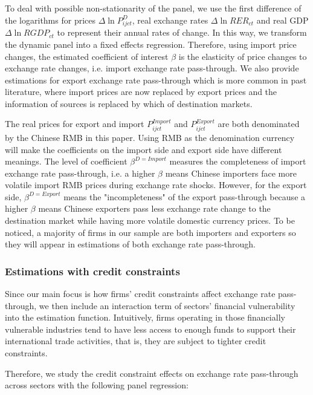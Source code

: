 \documentclass[12pt]{article}
\begin{document}
To deal with possible non-stationarity of the panel, we use the first difference of the logarithms for prices $\Delta \ln P^{D}_{i j c t}$, real exchange rates $\Delta \ln R E R_{c t}$ and real GDP $\Delta \ln R G D P_{c t}$ to represent their annual rates of change. In this way, we transform the dynamic panel into a fixed effects regression. Therefore, using import price changes, the estimated coefficient of interest $\beta$ is the elasticity of price changes to exchange rate changes, i.e. import exchange rate pass-through. We also provide estimations for export exchange rate pass-through which is more common in past literature, where import prices are now replaced by export prices and the information of sources is replaced by which of destination markets. 

The real prices for export and import $P^{Import}_{i j c t}$ and $P^{Export}_{i j c t}$ are both denominated by the Chinese RMB in this paper. Using RMB as the denomination currency will make the coefficients on the import side and export side have different meanings. The level of coefficient $\beta^{D=Import}$ measures the completeness of import exchange rate pass-through, i.e. a higher $\beta$ means Chinese importers face more volatile import RMB prices during exchange rate shocks. However, for the export side,  $\beta^{D=Export}$ means the "incompleteness" of the export pass-through because a higher $\beta$ means Chinese exporters pass less exchange rate change to the destination market while having more volatile domestic currency prices. To be noticed, a majority of firms in our sample are both importers and exporters so they will appear in estimations of both exchange rate pass-through.

\subsubsection{Estimations with credit constraints}

Since our main focus is how firms' credit constraints affect exchange rate pass-through, we then include an interaction term of sectors’ financial vulnerability into the estimation function. Intuitively, firms operating in those financially vulnerable industries tend to have less access to enough funds to support their international trade activities, that is, they are subject to tighter credit constraints.

Therefore, we study the credit constraint effects on exchange rate pass-through across sectors with the following panel regression:
\end{document}
